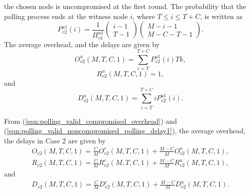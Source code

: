 \documentclass[12pt, onecolumn, draftcls]{IEEEtran}
\begin{document}
the chosen node is uncompromised at the first round. The probability
that the polling process ends at the witness node $i$, where $T\le i
\le T+C$, is written as
\begin{equation*}
P_{v2}^{u1}(i) = \frac{1}{\Pi_{v1}^{u1}}\left(\begin{array}{c} i-1 \\
T-1
\end{array}\right) \left(\begin{array}{c} M-i-1 \\ M-C-T-1
\end{array}\right).
\end{equation*}
The average overhead, and the delays are given by
\begin{equation}
O_{v2}^u(M,T,C,1)=\sum_{i=T}^{T+C} P_{v2}^{u1}(i) Tk,
\label{eqn:polling_valid_noncompromised_overhead}
\end{equation}
\begin{equation}
R_{v2}^u(M,T,C,1)=1,
\label{eqn:polling_valid_noncompromised_round_delay1}
\end{equation}
and
\begin{equation}
D_{v2}^u(M,T,C,1)=\sum_{i=T}^{T+C} iP_{v2}^{u1}(i).
\label{eqn:polling_valid_noncompromised_polling_delay1}
\end{equation}

{From} (\ref{eqn:polling_valid_compromised_overhead}) and
(\ref{eqn:polling_valid_noncompromised_polling_delay1}), the average
overhead, the delays in Case 2 are given by
\begin{eqnarray*}
O_{v2}(M,T,C,1) = \frac{C}{M} O_{v2}^c(M,T,C,1) + \frac{M-C}{M}
O_{v2}^u(M,T,C,1),
\end{eqnarray*}
\begin{eqnarray*}
R_{v2}(M,T,C,1) = \frac{C}{M} R_{v2}^c(M,T,C,1) + \frac{M-C}{M}
R_{v2}^u(M,T,C,1),
\end{eqnarray*}
and
\begin{eqnarray*}
D_{v2}(M,T,C,1) = \frac{C}{M} D_{v2}^c(M,T,C,1) + \frac{M-C}{M}
D_{v2}^u(M,T,C,1).
\end{eqnarray*}
\end{document}
